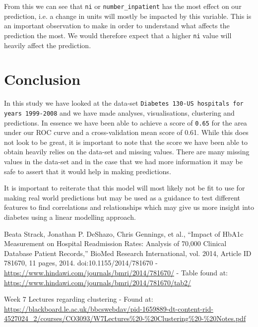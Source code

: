 \documentclass[11pt]{report}
\newcommand{\linespace}{\vspace{0.3cm}\noindent}
\begin{document}
\linespace
From this we can see that \texttt{ni} or \texttt{number\_inpatient} has the most effect on our prediction, i.e. a change in units will mostly be impacted by this variable. This is an important observation to make in order to understand what affects the prediction the most. We would therefore expect that a higher \texttt{ni} value will heavily affect the prediction. 

\section{Conclusion}
In this study we have looked at the data-set \texttt{Diabetes 130-US hospitals for years 1999-2008} and we have made analyses, visualisations, clustering and predictions. In essence we have been able to achieve a score of \texttt{0.65} for the area under our ROC curve and a cross-validation mean score of 0.61. While this does not look to be great, it is important to note that the score we have been able to obtain heavily relies on the data-set and missing values. There are many missing values in the data-set and in the case that we had more information it may be safe to assert that it would help in making predictions.

\linespace
It is important to reiterate that this model will most likely not be fit to use for making real world predictions but may be used as a guidance to test different features to find correlations and relationships which may give us more insight into diabetes using a linear modelling approach.

  \begin{thebibliography}{1}

   Beata Strack, Jonathan P. DeShazo, Chris Gennings, et al., “Impact of HbA1c Measurement on Hospital Readmission Rates: Analysis of 70,000 Clinical Database Patient Records,” BioMed Research International, vol. 2014, Article ID 781670, 11 pages, 2014. doi:10.1155/2014/781670 - \url{https://www.hindawi.com/journals/bmri/2014/781670/} - Table found at: \url{https://www.hindawi.com/journals/bmri/2014/781670/tab2/}
  
     Week 7 Lectures regarding clustering - Found at: \url{https://blackboard.le.ac.uk/bbcswebdav/pid-1659889-dt-content-rid-4527024_2/courses/CO3093/W7Lectures%20-%20Clustering%20-%20Notes.pdf}

  \end{thebibliography}
\end{document}
